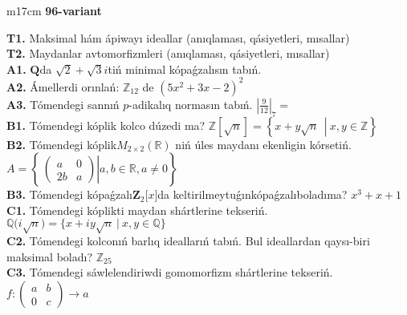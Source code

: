 \documentclass{article}
\begin{document}
\begin{tabular}{m{17cm}}
\textbf{96-variant}
\newline

\textbf{T1.} Maksimal hám ápiwayı ideallar (anıqlaması, qásiyetleri, mısallar) \\
\textbf{T2.} Maydanlar avtomorfizmleri (anıqlaması, qásiyetleri, mısallar) \\
\textbf{A1.} \(\mathbf{Q}\)da \(\sqrt{2} + \sqrt{3}i\)tiń minimal kópaǵzalısın tabıń. \\
\textbf{A2.} Ámellerdi orınlań: \(\mathbb{Z}_{12}\) de \(\left( 5x^{2} + 3x - 2 \right)^{2}\) \\
\textbf{A3.} Tómendegi sannıń \(p\)-adikalıq normasın tabıń. \(|\frac{9}{12}|_{7} =\) \\
\textbf{B1.} Tómendegi kóplik kolco dúzedi ma? \(\mathbb{Z}\left\lbrack \sqrt{n} \right\rbrack = \left\{ x + y\sqrt{n}\ \ \left| \right.\ x,y \in \mathbb{Z} \right\}\) \\
\textbf{B2.} Tómendegi kóplik\(M_{2 \times 2}\left( \mathbb{R} \right)\) niń úles maydanı ekenligin kórsetiń. \(A = \left\{ \left. \ \begin{pmatrix}
a & 0 \\
2b & a
\end{pmatrix} \right|a,b\mathbb{\in R},a \neq 0 \right\}\) \\
\textbf{B3.} Tómendegi kópaǵzalı\(\mathbf{Z}_{2}\lbrack x\rbrack\)da keltirilmeytuǵınkópaǵzalıboladıma? \(x^{3} + x + 1\) \\
\textbf{C1.} Tómendegi kóplikti maydan shártlerine tekseriń. \(\mathbb{Q(}i\sqrt{n}) = \{ x + iy\sqrt{n}\ |\ x,y \in \mathbb{Q}\}\) \\
\textbf{C2.} Tómendegi kolconıń barlıq ideallarıń tabıń. Bul ideallardan qaysı-biri maksimal boladı? \(\mathbb{Z}_{25}\) \\
\textbf{C3.} Tómendegi sáwlelendiriwdi gomomorfizm shártlerine tekseriń. \(f:\begin{pmatrix}
a & b \\
0 & c
\end{pmatrix} \rightarrow a\) \\

\end{tabular}
\vspace{1cm}
\end{document}
